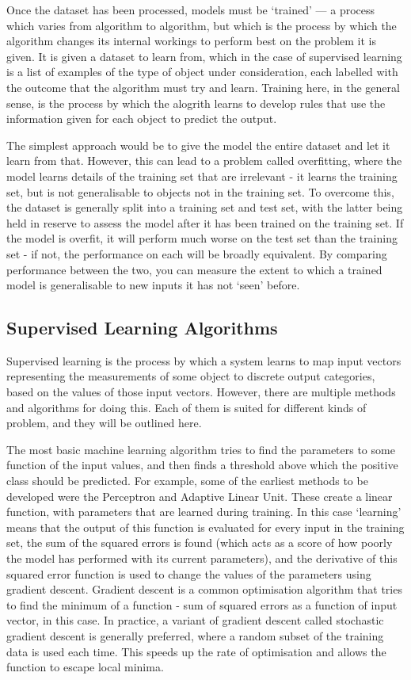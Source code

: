 Once the dataset has been processed, models must be `trained' --- a process which varies from algorithm to algorithm, but which is the process by which the algorithm changes its internal workings to perform best on the problem it is given. It is given a dataset to learn from, which in the case of supervised learning is a list of examples of the type of object under consideration, each labelled with the outcome that the algorithm must try and learn. Training here, in the general sense, is the process by which the alogrith learns to develop rules that use the information given for each object to predict the output.

The simplest approach would be to give the model the entire dataset and let it learn from that. However, this can lead to a problem called overfitting, where the model learns details of the training set that are irrelevant - it learns the training set, but is not generalisable to objects not in the training set. To overcome this, the dataset is generally split into a training set and test set, with the latter being held in reserve to assess the model after it has been trained on the training set. If the model is overfit, it will perform much worse on the test set than the training set - if not, the performance on each will be broadly equivalent. By comparing performance between the two, you can measure the extent to which a trained model is generalisable to new inputs it has not `seen' before.

\subsection{Supervised Learning Algorithms}

Supervised learning is the process by which a system learns to map input vectors representing the measurements of some object to discrete output categories, based on the values of those input vectors. However, there are multiple methods and algorithms for doing this. Each of them is suited for different kinds of problem, and they will be outlined here.

The most basic machine learning algorithm tries to find the parameters to some function of the input values, and then finds a threshold above which the positive class should be predicted. For example, some of the earliest methods to be developed were the Perceptron and Adaptive Linear Unit. These create a linear function, with parameters that are learned during training. In this case `learning' means that the output of this function is evaluated for every input in the training set, the sum of the squared errors is found (which acts as a score of how poorly the model has performed with its current parameters), and the derivative of this squared error function is used to change the values of the parameters using gradient descent. Gradient descent is a common optimisation algorithm that tries to find the minimum of a function - sum of squared errors as a function of input vector, in this case. In practice, a variant of gradient descent called stochastic gradient descent is generally preferred, where a random subset of the training data is used each time. This speeds up the rate of optimisation and allows the function to escape local minima.

